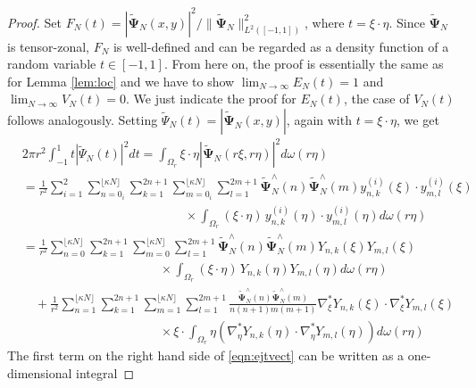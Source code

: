 \documentclass[a4paper, 10pt]{article}
\numberwithin{equation}{section}
\theoremstyle{definition}
\begin{document}
\begin{proof}
Set $F_N(t)={|\tilde{\mathbf{\Psi}}_N(x,y)|^2}/{\|\tilde{\mathbf{\Psi}}_N\|^2_{L^2([-1,1])}}$, where $t=\xi \cdot\eta $. Since $\tilde{\mathbf{\Psi}}_N$ is tensor-zonal, $F_N$ is well-defined and can be regarded as a density function of a random variable $t\in[-1,1]$. From here on, the proof is essentially the same as for Lemma \ref{lem:loc} and we have to show $\lim_{N\to\infty}E_N(t)=1$ and $\lim_{N\to\infty}V_N(t)=0$. We just indicate the proof for $E_N(t)$, the case of $V_N(t)$ follows analogously. Setting $\tilde{\Psi}_N(t)=|\tilde{\mathbf{\Psi}}_N(x,y)|$, again with  $t=\xi \cdot\eta $, we get
\begin{align}\label{eqn:ejtvect}
&2\pi r^2\int_{-1}^1t|\tilde{\Psi}_N(t)|^2dt=\int_{\Omega_r}\xi \cdot\eta \left|\tilde{\mathbf{\Psi}}_N\left(r\xi ,r\eta \right)\right|^2d\omega(r\eta)
\\&=\frac{1}{r^2}\sum_{i=1}^2\sum_{n=0_i}^{\lfloor \kappa N\rfloor}\sum_{k=1}^{2n+1}\sum_{m=0_i}^{{\lfloor \kappa N\rfloor}}\sum_{l=1}^{2m+1}\tilde{\mathbf{\Psi}}_N^\wedge(n)\tilde{\mathbf{\Psi}}_N^\wedge(m)y_{n,k}^{(i)}\left(\xi \right)\cdot y_{m,l}^{(i)}\left(\xi \right)\nonumber
\\&\qquad\qquad\qquad\qquad\qquad\qquad\quad\times\int_{\Omega_r}(\xi \cdot\eta)\,  y_{n,k}^{(i)}\left(\eta \right)\cdot y_{m,l}^{(i)}\left(\eta \right)d\omega(r\eta)\nonumber
\\&=\frac{1}{r^2}\sum_{n=0}^{\lfloor \kappa N\rfloor}\sum_{k=1}^{2n+1}\sum_{m=0}^{{\lfloor \kappa N\rfloor}}\sum_{l=1}^{2m+1}\tilde{\mathbf{\Psi}}_N^\wedge(n)\tilde{\mathbf{\Psi}}_N^\wedge(m)Y_{n,k}\left(\xi \right)Y_{m,l}\left(\xi \right)\nonumber
\\&\qquad\qquad\qquad\qquad\qquad\quad\times\int_{\Omega_r}(\xi \cdot\eta)\, Y_{n,k}\left(\eta \right)Y_{m,l}\left(\eta \right)d\omega(r\eta)\nonumber
\\&\quad+\frac{1}{r^2}\sum_{n=1}^{\lfloor \kappa N\rfloor}\sum_{k=1}^{2n+1}\sum_{m=1}^{{\lfloor \kappa N\rfloor}}\sum_{l=1}^{2m+1}\frac{\tilde{\mathbf{\Psi}}_N^\wedge(n)\tilde{\mathbf{\Psi}}_N^\wedge(m)}{n(n+1)m(m+1)}\nabla^*_{\xi }Y_{n,k}\left(\xi \right)\cdot\nabla^*_{\xi }Y_{m,l}\left(\xi \right)\nonumber
\\&\qquad\qquad\qquad\qquad\qquad\quad\times\xi \cdot\int_{\Omega_r}\eta \left(\nabla^*_{\eta }Y_{n,k}\left(\eta \right)\cdot\nabla^*_{\eta }Y_{m,l}\left(\eta \right)\right)d\omega(r\eta)\nonumber
\end{align}\normalsize
The first term on the right hand side of \eqref{eqn:ejtvect} can be written as a one-dimensional integral

\end{proof}
\end{document}
